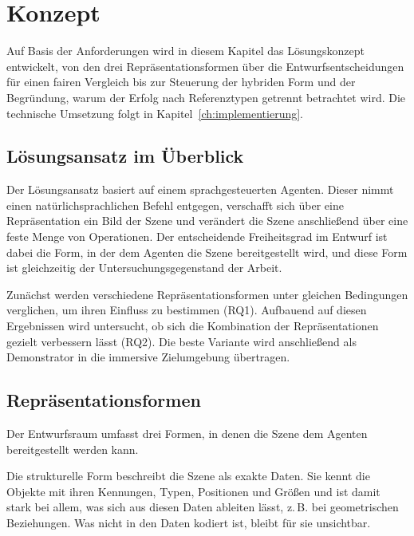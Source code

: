 
\chapter{Konzept}
\label{ch:konzept}

Auf Basis der Anforderungen wird in diesem Kapitel das Lösungskonzept entwickelt, von den drei Repräsentationsformen über die Entwurfsentscheidungen für einen fairen Vergleich bis zur Steuerung der hybriden Form und der Begründung, warum der Erfolg nach Referenztypen getrennt betrachtet wird.
Die technische Umsetzung folgt in Kapitel~\ref{ch:implementierung}.


\section{Lösungsansatz im Überblick}
\label{sec:konz-ueberblick}

Der Lösungsansatz basiert auf einem sprachgesteuerten Agenten.
Dieser nimmt einen natürlichsprachlichen Befehl entgegen, verschafft sich über eine Repräsentation ein Bild der Szene und verändert die Szene anschließend über eine feste Menge von Operationen.
Der entscheidende Freiheitsgrad im Entwurf ist dabei die Form, in der dem Agenten die Szene bereitgestellt wird, und diese Form ist gleichzeitig der Untersuchungsgegenstand der Arbeit.

Zunächst werden verschiedene Repräsentationsformen unter gleichen Bedingungen verglichen, um ihren Einfluss zu bestimmen (RQ1).
Aufbauend auf diesen Ergebnissen wird untersucht, ob sich die Kombination der Repräsentationen gezielt verbessern lässt (RQ2).
Die beste Variante wird anschließend als Demonstrator in die immersive Zielumgebung übertragen.


\section{Repräsentationsformen}
\label{sec:konz-repraesentationen}

Der Entwurfsraum umfasst drei Formen, in denen die Szene dem Agenten bereitgestellt werden kann.

Die strukturelle Form beschreibt die Szene als exakte Daten.
Sie kennt die Objekte mit ihren Kennungen, Typen, Positionen und Größen und ist damit stark bei allem, was sich aus diesen Daten ableiten lässt, z.\,B. bei geometrischen Beziehungen.
Was nicht in den Daten kodiert ist, bleibt für sie unsichtbar.

